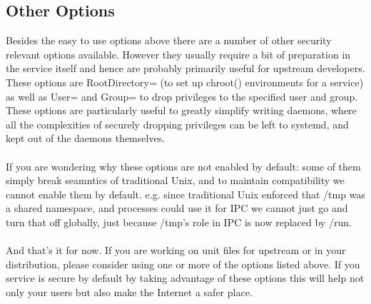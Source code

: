 \documentclass[titlepage]{article}
\begin{document}
\subsection{Other Options}
Besides the easy to use options above there are a number of other security relevant options available. However they usually require a bit of preparation in the service itself and hence are probably primarily useful for upstream developers. These options are RootDirectory= (to set up chroot() environments for a service) as well as User= and Group= to drop privileges to the specified user and group. These options are particularly useful to greatly simplify writing daemons, where all the complexities of securely dropping privileges can be left to systemd, and kept out of the daemons themselves.
\\
\\
If you are wondering why these options are not enabled by default: some of them simply break seamntics of traditional Unix, and to maintain compatibility we cannot enable them by default. e.g. since traditional Unix enforced that /tmp was a shared namespace, and processes could use it for IPC we cannot just go and turn that off globally, just because /tmp's role in IPC is now replaced by /run.
\\
\\
And that's it for now. If you are working on unit files for upstream or in your distribution, please consider using one or more of the options listed above. If you service is secure by default by taking advantage of these options this will help not only your users but also make the Internet a safer place.
\end{document}
